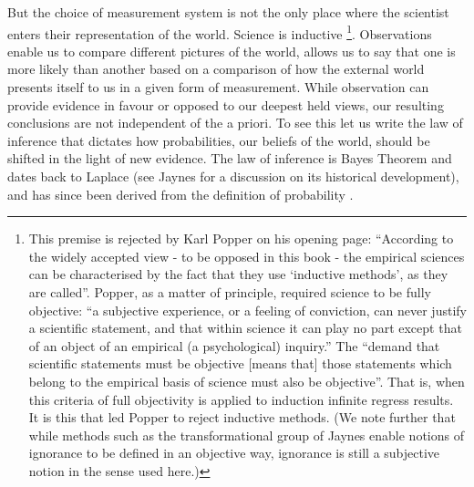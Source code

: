 But the choice of measurement system is not the only place where the scientist enters 
their representation of the world.
Science is inductive%
\footnote{
This premise is  rejected by Karl Popper\cite{Popper2002} on his opening
page:
``According to the widely accepted view - to be opposed in this book - 
the empirical sciences can be characterised by the fact that they use
`inductive methods', as they are called''.
Popper, as a matter of principle, required science to be fully
objective:
``a subjective experience, or a feeling of conviction, can never
justify a scientific statement, and that within science it can play no
part except that of an object of an empirical (a psychological)
inquiry.''
The ``demand that scientific statements must be objective [means that]
those statements which belong to the empirical basis of science must
also be objective''. 
That is, when this criteria of full objectivity is applied to  induction
infinite regress results.  
It is this that led Popper to reject inductive methods.
(We note further that while methods such as the transformational group of 
Jaynes\cite{Jaynes1973a} enable notions of ignorance to be defined in an
objective way, ignorance is still a subjective notion in the sense
used here.)
%
%
%
}.
Observations enable us to compare different pictures of the world,
allows us to say that one is more likely than another
based on a comparison of how the external world presents itself to us in a given form of measurement.
While observation can provide evidence in favour or opposed to our
deepest held views,
our resulting conclusions are  not independent of the a priori.
To see this let us write the law of inference
that dictates how probabilities,
our beliefs of the world,
should be shifted in the light of new evidence.
The law of inference is Bayes Theorem and dates back to 
Laplace (see Jaynes\cite{Jaynes1979} for a discussion on its historical development),
and has since been derived from the definition of probability
\cite{Cox1946, Skilling1991}.

